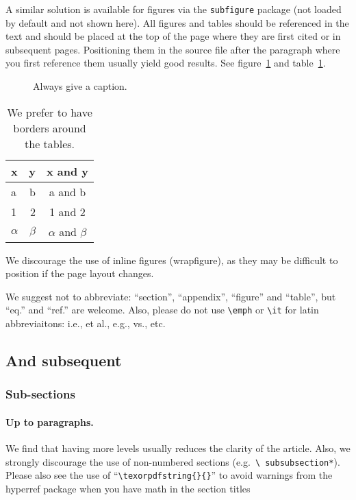 \documentclass[a4paper,11pt]{article}
\begin{document}
A similar solution is available for figures via the \texttt{subfigure}
package (not loaded by default and not shown here).
All figures and tables should be referenced in the text and should be
placed at the top of the page where they are first cited or in
subsequent pages. Positioning them in the source file
after the paragraph where you first reference them usually yield good
results. See figure~\ref{fig:i} and table~\ref{tab:i}.

\begin{figure}[tbp]
\centering %
\hfill
\caption{\label{fig:i} Always give a caption.}
\end{figure}

\begin{table}[tbp]
\centering
\begin{tabular}{|lr|c|}
\hline
x&y&x and y\\
\hline
a & b & a and b\\
1 & 2 & 1 and 2\\
$\alpha$ & $\beta$ & $\alpha$ and $\beta$\\
\hline
\end{tabular}
\caption{\label{tab:i} We prefer to have borders around the tables.}
\end{table}

We discourage the use of inline figures (wrapfigure), as they may be
difficult to position if the page layout changes.

We suggest not to abbreviate: ``section'', ``appendix'', ``figure''
and ``table'', but ``eq.'' and ``ref.'' are welcome. Also, please do
not use \texttt{\textbackslash emph} or \texttt{\textbackslash it} for
latin abbreviaitons: i.e., et al., e.g., vs., etc.

\subsection{And subsequent}
\subsubsection{Sub-sections}
\paragraph{Up to paragraphs.} We find that having more levels usually
reduces the clarity of the article. Also, we strongly discourage the
use of non-numbered sections (e.g.~\texttt{\textbackslash
subsubsection*}).  Please also see the use of
``\texttt{\textbackslash texorpdfstring\{\}\{\}}'' to avoid warnings
from the hyperref package when you have math in the section titles
\end{document}
